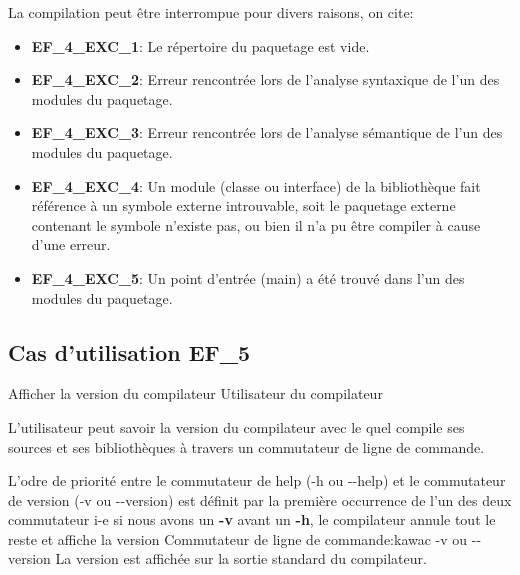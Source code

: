 {                                                %
 
}{} %
{	La compilation peut être interrompue pour divers raisons, on cite:
	\begin{itemize}
  	\item \textbf {EF\_4\_EXC\_1}: Le répertoire du paquetage est vide.
  	\item \textbf {EF\_4\_EXC\_2}: Erreur rencontrée lors de l'analyse syntaxique de l'un des modules du paquetage.
  	\item \textbf {EF\_4\_EXC\_3}: Erreur rencontrée lors de l'analyse sémantique de l'un des modules du paquetage.
  	\item \textbf {EF\_4\_EXC\_4}: Un module (classe ou interface) de la bibliothèque fait référence à un symbole externe introuvable, soit le paquetage externe contenant le symbole n'existe pas, ou bien il n'a pu être compiler à cause d'une erreur.

  	\item \textbf {EF\_4\_EXC\_5}: Un point d'entrée (main) a été trouvé dans l'un des modules du paquetage.
  	\end {itemize}

} %
\subsection{Cas d'utilisation EF\_5}
\fiche
{Afficher la version du compilateur}                      %
{Utilisateur du compilateur}                               %
{                                                %
   
L'utilisateur peut savoir la version du compilateur avec le quel compile ses sources et ses bibliothèques  à travers un commutateur de ligne de commande.   
}
{
   L'odre de priorité entre le commutateur de help (-h ou -\hspace{0.1mm}-help) et le commutateur de version (-v ou -\hspace{0.1mm}-version) est définit par la première occurrence de l'un des deux commutateur i-e si nous avons un \textbf {-v} avant un \textbf {-h}, le compilateur annule tout le reste et affiche la version
}                                                %
{Commutateur de ligne de commande:kawac -v ou -\hspace{0.1mm}-version}                             %
{La version est affichée sur la sortie standard du compilateur.}                       %
{                                                %
 
}{} %
{} %
